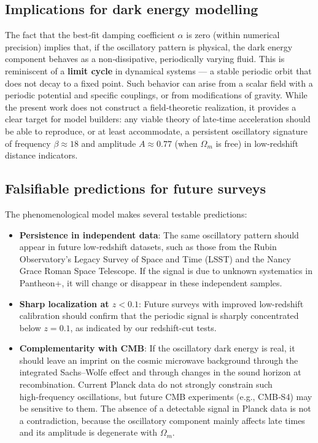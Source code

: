 \documentclass[10pt,a4paper,twocolumn]{article}
\begin{document}
\subsection{Implications for dark energy modelling}
The fact that the best‑fit damping coefficient $\alpha$ is zero (within numerical precision) implies that, if the oscillatory pattern is physical, the dark energy component behaves as a non‑dissipative, periodically varying fluid. This is reminiscent of a \textbf{limit cycle} in dynamical systems — a stable periodic orbit that does not decay to a fixed point. Such behavior can arise from a scalar field with a periodic potential and specific couplings, or from modifications of gravity. While the present work does not construct a field‑theoretic realization, it provides a clear target for model builders: any viable theory of late‑time acceleration should be able to reproduce, or at least accommodate, a persistent oscillatory signature of frequency $\beta\approx18$ and amplitude $A\approx0.77$ (when $\Omega_m$ is free) in low‑redshift distance indicators.

\subsection{Falsifiable predictions for future surveys}
The phenomenological model makes several testable predictions:
\begin{itemize}
    \item \textbf{Persistence in independent data}: The same oscillatory pattern should appear in future low‑redshift datasets, such as those from the Rubin Observatory’s Legacy Survey of Space and Time (LSST) and the Nancy Grace Roman Space Telescope. If the signal is due to unknown systematics in Pantheon+, it will change or disappear in these independent samples.
    \item \textbf{Sharp localization at $z<0.1$}: Future surveys with improved low-redshift calibration should confirm that the periodic signal is sharply concentrated below $z=0.1$, as indicated by our redshift-cut tests.
    \item \textbf{Complementarity with CMB}: If the oscillatory dark energy is real, it should leave an imprint on the cosmic microwave background through the integrated Sachs–Wolfe effect and through changes in the sound horizon at recombination. Current Planck data do not strongly constrain such high‑frequency oscillations, but future CMB experiments (e.g., CMB‑S4) may be sensitive to them. The absence of a detectable signal in Planck data is not a contradiction, because the oscillatory component mainly affects late times and its amplitude is degenerate with $\Omega_m$.
\end{itemize}
\end{document}
